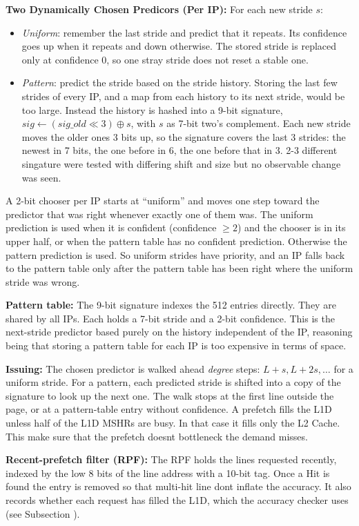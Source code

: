 \textbf{Two Dynamically Chosen Predicors (Per IP):} For each new stride $s$:
\begin{itemize}
  \item \emph{Uniform}: remember the last stride and predict that it repeats. Its confidence goes up when it repeats and down otherwise. The stored stride is replaced only at confidence 0, so one stray stride does not reset a stable one.
  \item \emph{Pattern}: predict the stride based on the stride history. Storing the last few strides of every IP, and a map from each history to its next stride, would be too large. Instead the history is hashed into a 9-bit signature, $\textit{sig} \leftarrow (\textit{sig\_old} \ll 3) \oplus s$, with $s$ as 7-bit two's complement. Each new stride moves the older ones 3 bits up, so the signature covers the last 3 strides: the newest in 7 bits, the one before in 6, the one before that in 3. 2-3 different singature were tested with differing shift and size but no observable change was seen.
\end{itemize}

A 2-bit chooser per IP starts at ``uniform'' and moves one step toward the predictor that was right whenever exactly one of them was. The uniform prediction is used when it is confident (confidence $\ge 2$) and the chooser is in its upper half, or when the pattern table has no confident prediction. Otherwise the pattern prediction is used. So uniform strides have priority, and an IP falls back to the pattern table only after the pattern table has been right where the uniform stride was wrong.

\textbf{Pattern table:} The 9-bit signature indexes the 512 entries directly. They are shared by all IPs. Each holds a 7-bit stride and a 2-bit confidence. This is the next-stride predictor based purely on the history independent of the IP, reasoning being that storing a pattern table for each IP is too expensive in terms of space.

\textbf{Issuing:} The chosen predictor is walked ahead \emph{degree} steps: $L+s, L+2s, \dots$ for a uniform stride. For a pattern, each predicted stride is shifted into a copy of the signature to look up the next one. The walk stops at the first line outside the page, or at a pattern-table entry without confidence. A prefetch fills the L1D unless half of the L1D MSHRs are busy. In that case it fills only the L2 Cache. This make sure that the prefetch doesnt bottleneck the demand misses.

\textbf{Recent-prefetch filter (RPF):} The RPF holds the lines requested recently, indexed by the low 8 bits of the line address with a 10-bit tag. Once a Hit is found the entry is removed so that multi-hit line dont inflate the accuracy. It also records whether each request has filled the L1D, which the accuracy checker uses (see Subsection ).

